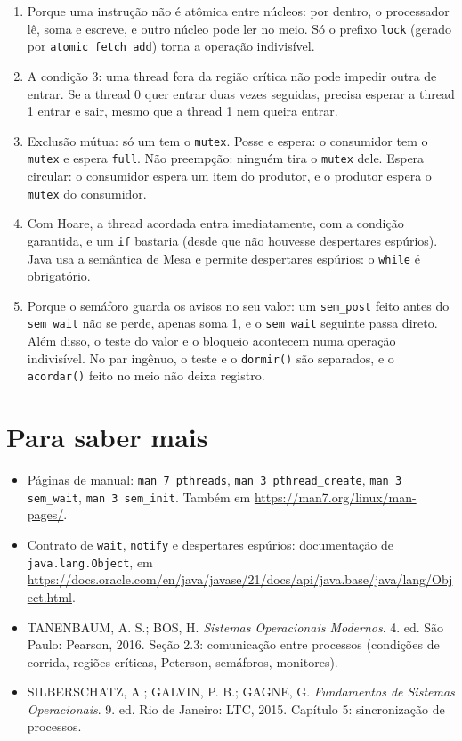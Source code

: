 \documentclass[11pt,a4paper]{article}
\newcommand{\cmd}[1]{\texttt{#1}}
\begin{document}
\begin{enumerate}
    \item Porque uma instrução não é atômica entre núcleos: por dentro, o processador lê, soma e escreve, e outro núcleo pode ler no meio. Só o prefixo \cmd{lock} (gerado por \cmd{atomic\_fetch\_add}) torna a operação indivisível.
    \item A condição 3: uma thread fora da região crítica não pode impedir outra de entrar. Se a thread 0 quer entrar duas vezes seguidas, precisa esperar a thread 1 entrar e sair, mesmo que a thread 1 nem queira entrar.
    \item Exclusão mútua: só um tem o \cmd{mutex}. Posse e espera: o consumidor tem o \cmd{mutex} e espera \cmd{full}. Não preempção: ninguém tira o \cmd{mutex} dele. Espera circular: o consumidor espera um item do produtor, e o produtor espera o \cmd{mutex} do consumidor.
    \item Com Hoare, a thread acordada entra imediatamente, com a condição garantida, e um \cmd{if} bastaria (desde que não houvesse despertares espúrios). Java usa a semântica de Mesa e permite despertares espúrios: o \cmd{while} é obrigatório.
    \item Porque o semáforo guarda os avisos no seu valor: um \cmd{sem\_post} feito antes do \cmd{sem\_wait} não se perde, apenas soma 1, e o \cmd{sem\_wait} seguinte passa direto. Além disso, o teste do valor e o bloqueio acontecem numa operação indivisível. No par ingênuo, o teste e o \cmd{dormir()} são separados, e o \cmd{acordar()} feito no meio não deixa registro.
\end{enumerate}

\section*{Para saber mais}

\begin{itemize}
    \item Páginas de manual: \cmd{man 7 pthreads}, \cmd{man 3 pthread\_create}, \cmd{man 3 sem\_wait}, \cmd{man 3 sem\_init}. Também em \url{https://man7.org/linux/man-pages/}.
    \item Contrato de \cmd{wait}, \cmd{notify} e despertares espúrios: documentação de \cmd{java.lang.Object}, em \url{https://docs.oracle.com/en/java/javase/21/docs/api/java.base/java/lang/Object.html}.
    \item TANENBAUM, A. S.; BOS, H. \emph{Sistemas Operacionais Modernos}. 4. ed. São Paulo: Pearson, 2016. Seção 2.3: comunicação entre processos (condições de corrida, regiões críticas, Peterson, semáforos, monitores).
    \item SILBERSCHATZ, A.; GALVIN, P. B.; GAGNE, G. \emph{Fundamentos de Sistemas Operacionais}. 9. ed. Rio de Janeiro: LTC, 2015. Capítulo 5: sincronização de processos.
\end{itemize}
\end{document}
